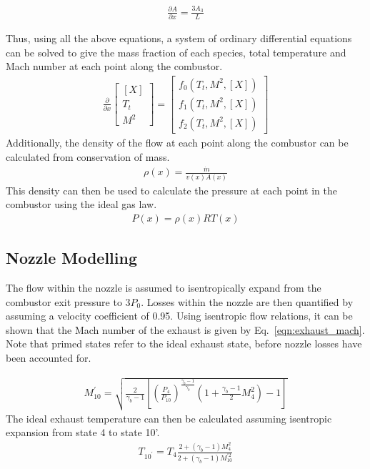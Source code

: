 \documentclass[a4paper]{article}
\begin{document}
\begin{align}
    \frac{\partial A}{\partial x} = \frac{3A_3}{L}
\end{align}

Thus, using all the above equations, a system of ordinary differential equations can be solved to give the mass fraction of each species, total temperature and Mach number at each point along the combustor.
\begin{align}
    \frac{\partial}{\partial x} 
    \begin{bmatrix}
    \left[ X \right] \\
    T_t\\
    M^2
    \end{bmatrix}
    =
    \begin{bmatrix}
        f_0 \left(T_t, M^2, \left[ X \right]\right)\\
        f_1 \left(T_t, M^2, \left[ X \right]\right)\\
        f_2 \left(T_t, M^2, \left[ X \right]\right)
    \end{bmatrix}
\end{align}
Additionally, the density of the flow at each point along the combustor can be calculated from conservation of mass.
\begin{align}
    \rho(x) = \frac{\dot{m}}{v(x) A(x)}
\end{align}
This density can then be used to calculate the pressure at each point in the combustor using the ideal gas law.
\begin{align}
    P(x) = \rho(x) R T(x)
\end{align}

\subsection{Nozzle Modelling}
The flow within the nozzle is assumed to isentropically expand from the combustor exit pressure to \(3P_0\). Losses within the nozzle are then quantified by assuming a velocity coefficient of 0.95. Using isentropic flow relations, it can be shown that the Mach number of the exhaust is given by Eq.~\ref{eqn:exhaust_mach}. Note that primed states refer to the ideal exhaust state, before nozzle losses have been accounted for.

\begin{align}\label{eqn:exhaust_mach}
    M_{10}^\prime = \sqrt{\frac{2}{\gamma_b - 1} \left[ \left(\frac{P_4}{P_{10}} \right)^{\frac{\gamma_b-1}{\gamma_b}}\left( 1 + \frac{\gamma_b - 1}{2}M_4^2 \right) - 1 \right]}
\end{align}
The ideal exhaust temperature can then be calculated assuming isentropic expansion from state 4 to state 10'.
\begin{align}\label{eqn:T10_dash}
    T_{10^\prime} = T_4 \frac{2 + (\gamma_b - 1) M_4^2}{2 + (\gamma_b - 1) M_{10}^{\prime 2}}
\end{align}
\end{document}
